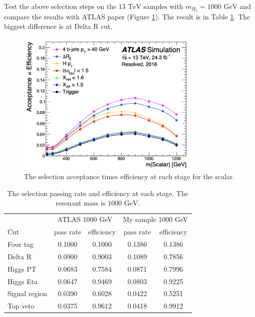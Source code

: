 \documentclass[12pt]{article}
\begin{document}
		Test the above selection steps on the $\text{13 TeV}$ samples with $m_{H_2} = \text{1000 GeV}$ and compare the results with ATLAS paper (Figure \ref{fig:ATLAS_signal_selection}). The result is in Table \ref{tab:signal_selection_efficiency_1000GeV}. The biggest difference is at Delta R cut. 
		\begin{figure}[htpb]
			\centering
			\includegraphics[width=0.8\textwidth]{ATLAS_signal_selection.png}
			\caption{The selection acceptance times efficiency at each stage for the scalar.}
			\label{fig:ATLAS_signal_selection}
		\end{figure}
		\begin{table}[htpb]
			\centering
			\caption{The selection passing rate and efficiency at each stage. The resonant mass is $\text{1000 GeV}$.}
			\label{tab:signal_selection_efficiency_1000GeV}
			\begin{tabular}{l|cc|cc}
							  & \multicolumn{2}{|c|}{ATLAS 1000 GeV} & \multicolumn{2}{|c}{My sample 1000 GeV} \\
				Cut           & pass rate       & efficiency       & pass rate         & efficiency         \\ \hline
				Four tag      & 0.1000 & 0.1000 & 0.1386 & 0.1386 \\
				Delta R       & 0.0900 & 0.9003 & 0.1089 & 0.7856 \\
				Higgs PT      & 0.0683 & 0.7584 & 0.0871 & 0.7996 \\
				Higgs Eta     & 0.0647 & 0.9469 & 0.0803 & 0.9225 \\
				Signal region & 0.0390 & 0.6028 & 0.0422 & 0.5251 \\
				Top veto      & 0.0375 & 0.9612 & 0.0418 & 0.9912
			\end{tabular}
		\end{table}
\end{document}
